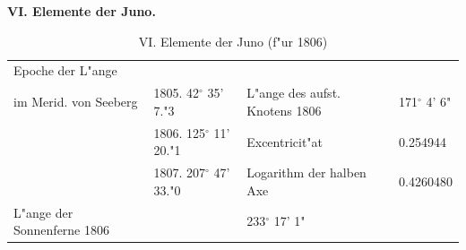 \documentclass[12pt,a4paper]{article}
\begin{document}
\textbf{VI. Elemente der Juno.}

\begin{table}[H]
\centering
\begin{tabular}{l l | l l}
\toprule
Epoche der L"ange & & & \\
im Merid. von Seeberg & 1805. 42$^\circ$ 35' 7."3 & L"ange des aufst. Knotens 1806 & 171$^\circ$ 4' 6" \\
& 1806. 125$^\circ$ 11' 20."1 & Excentricit"at & 0.254944 \\
& 1807. 207$^\circ$ 47' 33."0 & Logarithm der halben Axe & 0.4260480 \\
\midrule
L"ange der Sonnenferne 1806 & \dotfill & 233$^\circ$ 17' 1" \\
\bottomrule
\end{tabular}
\caption{VI. Elemente der Juno (f"ur 1806)}
\end{table}
\end{document}
